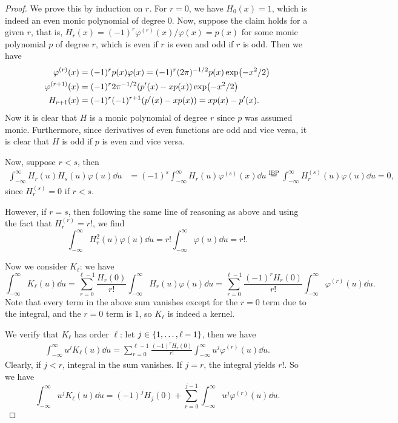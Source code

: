 \documentclass{article}
\theoremstyle{plain}
\theoremstyle{remark}
\renewcommand{\phi}{\varphi}
\begin{document}
\begin{proof}
 	We prove this by induction on $r$. For $r = 0$, we have $H_0(x) = 1$, which is indeed an even monic polynomial of degree 0. 
 	Now, suppose the claim holds for a given $r$, that is, $H_r(x) = (-1)^r \phi^{(r)}(x)/\phi(x) = p(x)$ for some monic polynomial $p$ of degree $r$, which is even if $r$ is even and odd if $r$ is odd. Then we have
 	\begin{align*}
 	\phi^{(r)}(x) &= (-1)^r p(x) \phi(x) = (-1)^r (2\pi)^{-1/2} p(x) \exp(-x^2/2) \\
 	\phi^{(r+1)}(x) &= (-1)^r 2\pi^{-1/2} \qty(p'(x) - x p(x)) \exp(-x^2/2) \\
 	H_{r+1 }(x) &= (-1)^r (-1)^{r+1} \qty(p'(x) - x p(x)) = xp(x) - p'(x). 
 	\end{align*}
 	Now it is clear that $H$ is a monic polynomial of degree $r$ since $p$ was assumed monic. Furthermore, since derivatives of even functions are odd and vice versa, it is clear that $H$ is odd if $p$ is even and vice versa. 

	Now, suppose $r < s$, then 
	\begin{align*}
		\int_{-\infty}^\infty H_r(u) H_s(u) \phi(u) \dd{u} &= (-1)^s \int_{-\infty}^\infty H_r(u) \phi^{(s)}(x) \dd{u} \overset{\text{IBP}}= \int_{-\infty}^\infty H_r^{(s)}(u) \phi(u) \dd{u} = 0,
	\end{align*}
since $H_r^{(s)} = 0$ if $r < s$. 

However, if $r = s$, then following the same line of reasoning as above and using the fact that $H_r^{(r)} = r!$, we find
\[
\int_{-\infty}^\infty H_r^2(u) \phi(u) \dd{u} = r! \int_{-\infty}^\infty \phi(u) \dd{u} = r!. 
\]

Now we consider $K_\ell$: we have
\[
\int_{-\infty}^\infty K_\ell(u) \dd{u} = \sum_{r=0}^{\ell - 1} \frac{H_r(0)}{r!} \int_{-\infty}^\infty H_r(u) \phi(u) \dd{u} =  \sum_{r=0}^{\ell - 1} \frac{(-1)^r H_r(0)}{r!} \int_{-\infty}^\infty \phi^{(r)}(u) \dd{u}.
\]
Note that every term in the above sum vanishes except for the $r = 0$ term due to the integral, and the $r = 0$ term is 1, so $K_\ell$ is indeed a kernel. 

We verify that $K_\ell$ has order $\ell$: let $j \in \qty{1, \dotsc, \ell - 1}$, then we have
\begin{align*}
	\int_{-\infty}^\infty u^j K_\ell(u) \dd{u} = \sum_{r=0}^{\ell - 1} \frac{(-1)^r H_r(0)}{r!} \int_{-\infty}^\infty u^j \phi^{(r)}(u) \dd{u}.
\end{align*}
Clearly, if $j < r$, integral in the sum vanishes. If $j = r$, the integral yields $r!$. So we have
\[
\int_{-\infty}^\infty u^j K_\ell(u) \dd{u} = (-1)^j H_j(0) + \sum_{r=0}^{j-1} \int_{-\infty}^\infty u^j \phi^{(r)}(u) \dd{u}. 
\]
\end{proof}
\end{document}

